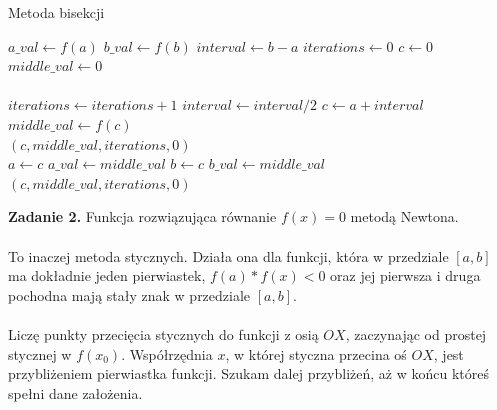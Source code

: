 \documentclass[15pt, a4paper]{article}
\begin{document}
\begin{algorithm}
\caption{Metoda bisekcji}
\label{alg:metoda_bisekcji}
\begin{algorithmic}[1]
    \State $a\_val \gets f(a)$
    \State $b\_val \gets f(b)$
    \State $interval \gets b - a$
    \State $iterations \gets 0$
    \State $c \gets 0$
    \State $middle\_val \gets 0$\\

        \State \Return {}
    \EndIf\\

        \State $iterations \gets iterations + 1$
        \State $interval \gets interval / 2$
        \State $c \gets a + interval$
        \State $middle\_val \gets f(c)$\\

            \State \Return $(c, middle\_val, iterations, 0)$
        \EndIf\\

            \State $a \gets c$
            \State $a\_val \gets middle\_val$
        \Else
            \State $b \gets c$
            \State $b\_val \gets middle\_val$
        \EndIf
    \EndWhile\\

    \State \Return $(c, middle\_val, iterations, 0)$\\
\EndFunction
\end{algorithmic}
\end{algorithm}

\vspace{0.5cm}

\noindent\hrulefill

\vspace{0.5cm}


\noindent\textbf{Zadanie 2.} Funkcja rozwiązująca równanie \( f(x) = 0 \) metodą Newtona.\\\\
\noindent To inaczej metoda stycznych. Działa ona dla funkcji, która w przedziale \([a, b]\) ma dokładnie jeden pierwiastek,  \(f(a) * f(x) < 0 \) oraz jej pierwsza i druga pochodna mają stały znak w przedziale \( [a, b] \).\\\\
\noindent Liczę punkty przecięcia stycznych do funkcji z osią \( OX \), zaczynając od prostej stycznej w \( f(x_0) \). Współrzędnia \(x\), w której styczna przecina oś \(OX\), jest przybliżeniem pierwiastka funkcji. Szukam dalej przybliżeń, aż w końcu któreś spełni dane założenia. 
\end{document}
